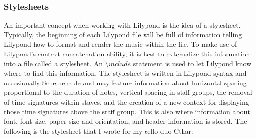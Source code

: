 \subsubsection{Stylesheets}

An important concept when working with Lilypond is the idea of a stylesheet. Typically, the beginning of each Lilypond file will be full of information telling Lilypond how to format and render the music within the file. To make use of Lilypond’s context concatenation ability, it is best to externalize this information into a file called a stylesheet. An \textbackslash$include$ statement is used to let Lilypond know where to find this information. The stylesheet is written in Lilypond syntax and occasionally Scheme code and may feature information about horizontal spacing proportional to the duration of notes, vertical spacing in staff groups, the removal of time signatures within staves, and the creation of a new context for displaying those time signatures above the staff group. This is also where information about font, font size, paper size and orientation, and header information is stored. The following is the stylesheet that I wrote for my cello duo Cthar:


